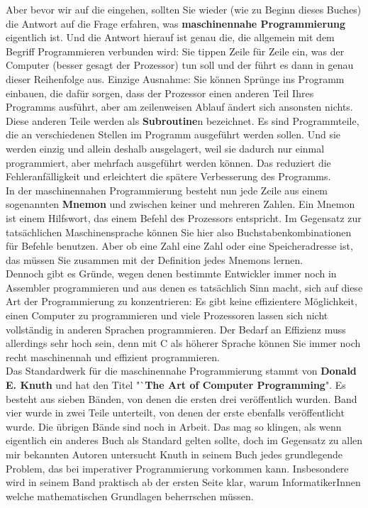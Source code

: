 Aber bevor wir auf die eingehen, sollten Sie wieder (wie zu Beginn dieses Buches) die Antwort auf die Frage erfahren, was \textbf{maschinennahe Programmierung} eigentlich ist. Und die Antwort hierauf ist genau die, die allgemein mit dem Begriff Programmieren verbunden wird: Sie tippen Zeile für Zeile ein, was der Computer (besser gesagt der Prozessor) tun soll und der führt es dann in genau dieser Reihenfolge aus. Einzige Ausnahme: Sie können Sprünge ins Programm einbauen, die dafür sorgen, dass der Prozessor einen anderen Teil Ihres Programms ausführt, aber am zeilenweisen Ablauf ändert sich ansonsten nichts. Diese anderen Teile werden als \textbf{Subroutine}n bezeichnet. Es sind Programmteile, die an verschiedenen Stellen im Programm ausgeführt werden sollen. Und sie werden einzig und allein deshalb ausgelagert, weil sie dadurch nur einmal programmiert, aber mehrfach ausgeführt werden können. Das reduziert die Fehleranfälligkeit und erleichtert die spätere Verbesserung des Programms.\\

In der maschinennahen Programmierung besteht nun jede Zeile aus einem sogenannten \textbf{Mnemon} und zwischen keiner und mehreren Zahlen. Ein Mnemon ist einem Hilfswort, das einem Befehl des Prozessors entspricht. Im Gegensatz zur tatsächlichen Maschinensprache können Sie hier also Buchstabenkombinationen für Befehle benutzen. Aber ob eine Zahl eine Zahl oder eine Speicheradresse ist, das müssen Sie zusammen mit der Definition jedes Mnemons lernen.\\

Dennoch gibt es Gründe, wegen denen bestimmte Entwickler immer noch in Assembler programmieren und aus denen es tatsächlich Sinn macht, sich auf diese Art der Programmierung zu konzentrieren: Es gibt keine effizientere Möglichkeit, einen Computer zu programmieren und viele Prozessoren lassen sich nicht vollständig in anderen Sprachen programmieren. Der Bedarf an Effizienz muss allerdings sehr hoch sein, denn mit C als höherer Sprache können Sie immer noch recht maschinennah und effizient programmieren.\\

Das Standardwerk für die maschinennahe Programmierung stammt von \textbf{Donald E. Knuth} und hat den Titel "`\textbf{The Art of Computer Programming}". Es besteht aus sieben Bänden, von denen die ersten drei veröffentlich wurden. Band vier wurde in zwei Teile unterteilt, von denen der erste ebenfalls veröffentlicht wurde. Die übrigen Bände sind noch in Arbeit. Das mag so klingen, als wenn eigentlich ein anderes Buch als Standard gelten sollte, doch im Gegensatz zu allen mir bekannten Autoren untersucht Knuth in seinem Buch jedes grundlegende Problem, das bei imperativer Programmierung vorkommen kann. Insbesondere wird in seinem Band praktisch ab der ersten Seite klar, warum InformatikerInnen welche mathematischen Grundlagen beherrschen müssen.\\

